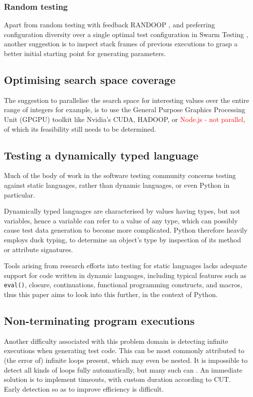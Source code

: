 \documentclass{icldt}
\numberwithin{equation}{section}       %
\begin{document}
\subsubsection{Random testing}
Apart from random testing with feedback RANDOOP \cite{Pacheco2007}, and preferring configuration diversity over a single optimal test configuration in Swarm Testing \cite{AlexGroceSep2011}, another suggestion is to inspect stack frames of previous executions to grasp a better initial starting point for generating parameters.
\subsection{Optimising search space coverage}
The suggestion to parallelise the search space for interesting values over the entire range of integers for example, is to use the General Purpose Graphics Processing Unit (GPGPU) toolkit like Nvidia's CUDA, HADOOP, or \textcolor{red}{Node.js - not parallel}, of which its feasibility still needs to be determined.
\subsection{Testing a dynamically typed language}
Much of the body of work in the software testing community concerns testing against static languages, rather than dynamic languages, or even Python in particular.

Dynamically typed languages are characterised by values having types, but not variables, hence a variable can refer to a value of any type, which can possibly cause test data generation to become more complicated. Python therefore heavily employs duck typing, to determine an object's type by inspection of its method or attribute signatures.

Tools arising from research efforts into testing for static languages lacks adequate support for code written in dynamic languages, including typical features such as \texttt{eval()}, closure, continuations, functional programming constructs, and macros, thus this paper aims to look into this further, in the context of Python.
\subsection{Non-terminating program executions}
Another difficulty associated with this problem domain is detecting infinite executions when generating test code. This can be most commonly attributed to (the error of) infinite loops present, which may even be nested. It is impossible to detect all kinds of loops fully automatically, but many such can \cite{Tahbildar}. An immediate solution is to implement timeouts, with custom duration according to CUT. Early detection so as to improve efficiency is difficult.
\end{document}
